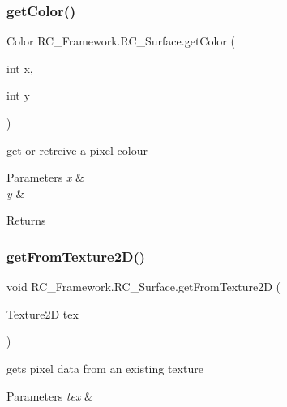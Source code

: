 \subsubsection{\texorpdfstring{get\+Color()}{getColor()}}
{\footnotesize\ttfamily Color R\+C\+\_\+\+Framework.\+R\+C\+\_\+\+Surface.\+get\+Color (\begin{DoxyParamCaption}\item[{int}]{x,  }\item[{int}]{y }\end{DoxyParamCaption})}



get or retreive a pixel colour 


\begin{DoxyParams}{Parameters}
{\em x} & \\
\hline
{\em y} & \\
\hline
\end{DoxyParams}
\begin{DoxyReturn}{Returns}

\end{DoxyReturn}
\mbox{\label{class_r_c___framework_1_1_r_c___surface_a93d79ef4363e12e80a454dc49a80770a}} 
\subsubsection{\texorpdfstring{get\+From\+Texture2\+D()}{getFromTexture2D()}}
{\footnotesize\ttfamily void R\+C\+\_\+\+Framework.\+R\+C\+\_\+\+Surface.\+get\+From\+Texture2D (\begin{DoxyParamCaption}\item[{Texture2D}]{tex }\end{DoxyParamCaption})}



gets pixel data from an existing texture 


\begin{DoxyParams}{Parameters}
{\em tex} & \\
\hline
\end{DoxyParams}
\mbox{\label{class_r_c___framework_1_1_r_c___surface_a88c34f3e232de3dd02f82c3145239553}} 
